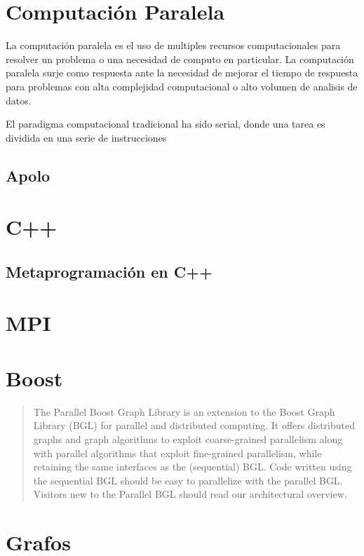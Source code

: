 \documentclass[twoside,letterpaper,12pt]{report}
\begin{document}
\section{Computación Paralela}

La computación paralela es el uso de multiples recursos computacionales para resolver un problema o una necesidad de computo en particular. La computación paralela surje como respuesta ante la necesidad de mejorar el tiempo de respuesta para problemas con alta complejidad computacional o alto volumen de analisis de datos. 

El paradigma computacional tradicional ha sido serial, donde una tarea es dividida en una serie de instrucciones 

\cite{PCI}
\cite{SC}

\subsection{Apolo}

\section{C++}
\subsection{Metaprogramación en C++}

\section{MPI}


\section{Boost}

\begin{quotation}
The Parallel Boost Graph Library is an extension to the Boost Graph Library (BGL) for parallel and distributed computing. It offers distributed graphs and graph algorithms to exploit coarse-grained parallelism along with parallel algorithms that exploit fine-grained parallelism, while retaining the same interfaces as the (sequential) BGL. Code written using the sequential BGL should be easy to parallelize with the parallel BGL. Visitors new to the Parallel BGL should read our architectural overview.\cite{wwwBoost} 
\end{quotation} 

\section{Grafos}
\end{document}
